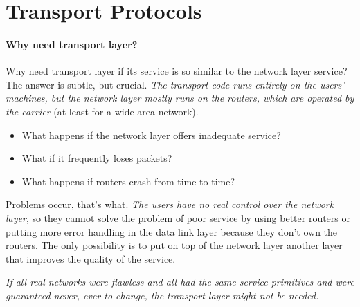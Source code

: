 \mode*
{}
\section{Transport Protocols}

\paragraph{Why need transport layer?}

  Why need transport layer if its service is so similar to the network layer service? The
  answer is subtle, but crucial. \emph{The transport code runs entirely on the users' machines,
  but the network layer mostly runs on the routers, which are operated by the carrier} (at
  least for a wide area network). 
  \begin{itemize}
  \item What happens if the network layer offers inadequate service?
  \item What if it frequently loses packets?
  \item What happens if routers crash from time to time?
  \end{itemize}
  Problems occur, that's what. \emph{The users have no real control over the network layer}, so
  they cannot solve the problem of poor service by using better routers or putting more
  error handling in the data link layer because they don't own the routers. The only
  possibility is to put on top of the network layer another layer that improves the
  quality of the service.

  \emph{If all real networks were flawless and all had the same service primitives and
    were guaranteed never, ever to change, the transport layer might not be needed.}

